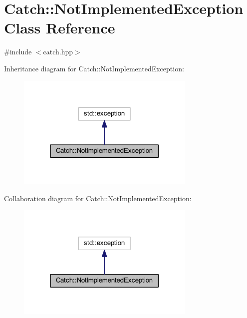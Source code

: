 \hypertarget{class_catch_1_1_not_implemented_exception}{}\section{Catch\+:\+:Not\+Implemented\+Exception Class Reference}
\label{class_catch_1_1_not_implemented_exception}


{\ttfamily \#include $<$catch.\+hpp$>$}



Inheritance diagram for Catch\+:\+:Not\+Implemented\+Exception\+:\nopagebreak
\begin{figure}[H]
\begin{center}
\leavevmode
\includegraphics[width=242pt]{class_catch_1_1_not_implemented_exception__inherit__graph}
\end{center}
\end{figure}


Collaboration diagram for Catch\+:\+:Not\+Implemented\+Exception\+:\nopagebreak
\begin{figure}[H]
\begin{center}
\leavevmode
\includegraphics[width=242pt]{class_catch_1_1_not_implemented_exception__coll__graph}
\end{center}
\end{figure}
